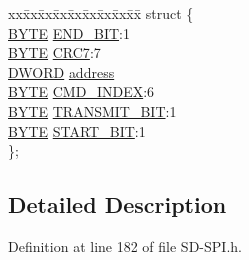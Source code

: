 \begin{DoxyCompactItemize}
\begin{tabbing}
\end{tabbing}\item 
\begin{tabbing}
xx\=xx\=xx\=xx\=xx\=xx\=xx\=xx\=xx\=\kill
struct \{\\
\>\hyperlink{_generic_type_defs_8h_a4ae1dab0fb4b072a66584546209e7d58}{BYTE} \hyperlink{union_c_m_d___p_a_c_k_e_t_a1ba6e89b8f1b747c60404b3b56d57e2d}{END\_BIT}:1\\
\>\hyperlink{_generic_type_defs_8h_a4ae1dab0fb4b072a66584546209e7d58}{BYTE} \hyperlink{union_c_m_d___p_a_c_k_e_t_ab1a55f215cb95eec5c6af7c67487cbc7}{CRC7}:7\\
\>\hyperlink{_generic_type_defs_8h_ad342ac907eb044443153a22f964bf0af}{DWORD} \hyperlink{union_c_m_d___p_a_c_k_e_t_ac5c3f71d50a709e54201184510194a68}{address}\\
\>\hyperlink{_generic_type_defs_8h_a4ae1dab0fb4b072a66584546209e7d58}{BYTE} \hyperlink{union_c_m_d___p_a_c_k_e_t_a026642b3c69ce06bdd447e1d08fdb5d1}{CMD\_INDEX}:6\\
\>\hyperlink{_generic_type_defs_8h_a4ae1dab0fb4b072a66584546209e7d58}{BYTE} \hyperlink{union_c_m_d___p_a_c_k_e_t_a3964c021590a119b76c058b64d02b63c}{TRANSMIT\_BIT}:1\\
\>\hyperlink{_generic_type_defs_8h_a4ae1dab0fb4b072a66584546209e7d58}{BYTE} \hyperlink{union_c_m_d___p_a_c_k_e_t_aa98be881f92e7f78989c1d8adc1e755b}{START\_BIT}:1\\
\}; \\

\end{tabbing}\end{DoxyCompactItemize}


\subsection{Detailed Description}


Definition at line 182 of file S\+D-\/\+S\+P\+I.\+h.



